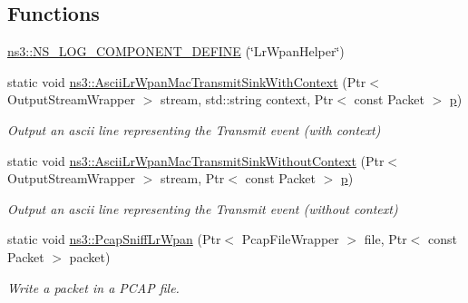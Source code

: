 \subsection*{Functions}
\begin{DoxyCompactItemize}
\item 
\hyperlink{namespacens3_a7a001ffdb8e6b94ee945e8a11c6d6efd}{ns3\+::\+N\+S\+\_\+\+L\+O\+G\+\_\+\+C\+O\+M\+P\+O\+N\+E\+N\+T\+\_\+\+D\+E\+F\+I\+NE} (\char`\"{}Lr\+Wpan\+Helper\char`\"{})
\item 
static void \hyperlink{namespacens3_a33e8db15e30905da375f8fd84052eda5}{ns3\+::\+Ascii\+Lr\+Wpan\+Mac\+Transmit\+Sink\+With\+Context} (Ptr$<$ Output\+Stream\+Wrapper $>$ stream, std\+::string context, Ptr$<$ const Packet $>$ \hyperlink{lte__link__budget__x2__handover__measures_8m_ac9de518908a968428863f829398a4e62}{p})
\begin{DoxyCompactList}\small\item\em Output an ascii line representing the Transmit event (with context) \end{DoxyCompactList}\item 
static void \hyperlink{namespacens3_a55e2dfa7fb9d30fbc6c174df2f29b25e}{ns3\+::\+Ascii\+Lr\+Wpan\+Mac\+Transmit\+Sink\+Without\+Context} (Ptr$<$ Output\+Stream\+Wrapper $>$ stream, Ptr$<$ const Packet $>$ \hyperlink{lte__link__budget__x2__handover__measures_8m_ac9de518908a968428863f829398a4e62}{p})
\begin{DoxyCompactList}\small\item\em Output an ascii line representing the Transmit event (without context) \end{DoxyCompactList}\item 
static void \hyperlink{namespacens3_a8f59f912ed9764503e17291c29780cbf}{ns3\+::\+Pcap\+Sniff\+Lr\+Wpan} (Ptr$<$ Pcap\+File\+Wrapper $>$ file, Ptr$<$ const Packet $>$ packet)
\begin{DoxyCompactList}\small\item\em Write a packet in a P\+C\+AP file. \end{DoxyCompactList}\end{DoxyCompactItemize}
